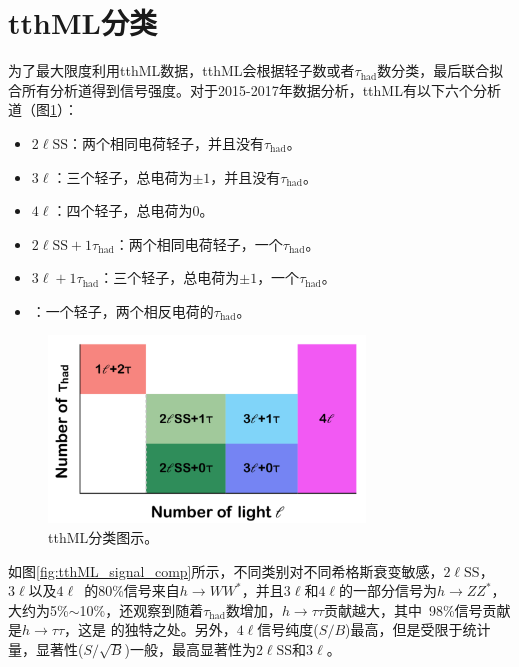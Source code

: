 \section{tthML分类}
为了最大限度利用tthML数据，tthML会根据轻子数或者$\tau_{\text{had}}$数分类，最后联合拟合所有分析道得到信号强度。对于2015-2017年数据分析，tthML有以下六个分析道（图\ref{fig:tthML_cates}）：
\begin{itemize}
 \item $2\ell\text{SS}$：两个相同电荷轻子，并且没有$\tau_{\text{had}}$。
 \item $3\ell$：三个轻子，总电荷为$\pm1$，并且没有$\tau_{\text{had}}$。
 \item $4\ell$：四个轻子，总电荷为0。
 \item $2\ell\text{SS}+1\tau_{\text{had}}$：两个相同电荷轻子，一个$\tau_{\text{had}}$。
 \item $3\ell+1\tau_{\text{had}}$：三个轻子，总电荷为$\pm1$，一个$\tau_{\text{had}}$。
 \item \ltwotau ：一个轻子，两个相反电荷的$\tau_{\text{had}}$。
\end{itemize}
\begin{figure}[h]
\centering
 \includegraphics[width=0.75\textwidth]{fig/tthML_cates.png}
 \caption{tthML分类图示。}
 \label{fig:tthML_cates}
\end{figure}
如图\ref{fig:tthML_signal_comp}所示，不同类别对不同希格斯衰变敏感，$2\ell\text{SS}$，$3\ell$以及$4\ell$~的80\%信号来自$h\rightarrow WW^*$，并且$3\ell$和$4\ell$的一部分信号为$h\rightarrow ZZ^*$，大约为5\%$\sim$10\%，还观察到随着$\tau_{\text{had}}$数增加，$h\rightarrow \tau\tau$贡献越大，其中\ltwotau ~98\%信号贡献是$h\rightarrow \tau\tau$，这是
\ltwotau 的独特之处。另外，$4\ell$信号纯度($S/B$)最高，但是受限于统计量，显著性($S/\sqrt{B}$)一般，最高显著性为$2\ell\text{SS}$和$3\ell$。
